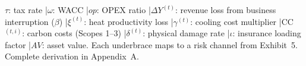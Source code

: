 \vspace{2mm}
\begin{center}
\end{center}
\vspace{1mm}
{\fontsize{7.5}{9}\selectfont\noindent $\tau$: tax rate \enspace|\enspace $\omega$: WACC \enspace|\enspace $op$: OPEX ratio \enspace|\enspace $\Delta Y^{(t)}$: revenue loss from business interruption ($\beta$) \enspace|\enspace $\xi^{(t)}$: heat productivity loss \enspace|\enspace $\gamma^{(t)}$: cooling cost multiplier \enspace|\enspace CC$^{(t,i)}$: carbon costs (Scopes 1--3) \enspace|\enspace $\delta^{(t)}$: physical damage rate \enspace|\enspace $\iota$: insurance loading factor \enspace|\enspace $AV$: asset value. Each underbrace maps to a risk channel from Exhibit~5. Complete derivation in Appendix~A.\par}

\vspace{3mm}

